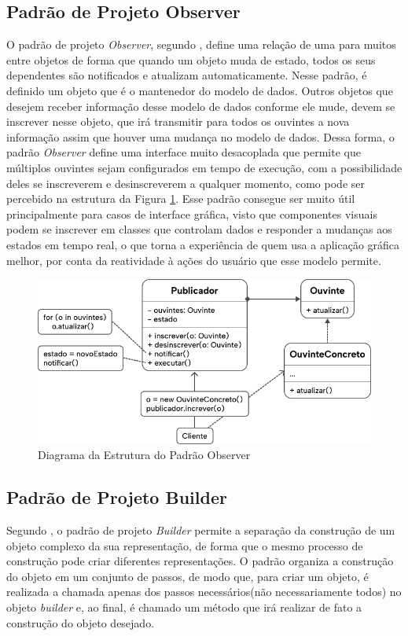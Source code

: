 \documentclass[12pt, %
openright, 
oneside, %
a4paper,    %
brazil]{facom-ufu-abntex2}
\begin{document}
\subsection{Padrão de Projeto Observer}

O padrão de projeto \textit{Observer}, segundo , define uma relação de uma para muitos entre objetos de forma que quando um objeto muda de estado, todos os seus dependentes são notificados e atualizam automaticamente. Nesse padrão, é definido um objeto que é o mantenedor do modelo de dados. Outros objetos que desejem receber informação desse modelo de dados conforme ele mude, devem se inscrever nesse objeto, que irá transmitir para todos os ouvintes a nova informação assim que houver uma mudança no modelo de dados. Dessa forma, o padrão \textit{Observer} define uma interface muito desacoplada que permite que múltiplos ouvintes sejam configurados em tempo de execução, com a possibilidade deles se inscreverem e desinscreverem a qualquer momento, como pode ser percebido na estrutura da Figura \ref{fig:observer_diagram}. Esse padrão consegue ser muito útil principalmente para casos de interface gráfica, visto que componentes visuais podem se inscrever em classes que controlam dados e responder a mudanças aos estados em tempo real, o que torna a experiência de quem usa a aplicação gráfica melhor, por conta da reatividade à ações do usuário que esse modelo permite.

\begin{figure}[ht]
    \centering
    \includegraphics[width=.65\textwidth]{figures/bibliographical_review/observer_diagram.png}
    \caption{Diagrama da Estrutura do Padrão Observer}
    \label{fig:observer_diagram}
\end{figure}

\subsection{Padrão de Projeto Builder}

Segundo , o padrão de projeto \textit{Builder} permite a separação da construção de um objeto complexo da sua representação, de forma que o mesmo processo de construção pode criar diferentes representações. O padrão organiza a construção do objeto em um conjunto de passos, de modo que, para criar um objeto, é realizada a chamada apenas dos passos necessários(não necessariamente todos) no objeto \textit{builder} e, ao final, é chamado um método que irá realizar de fato a construção do objeto desejado.
\end{document}
